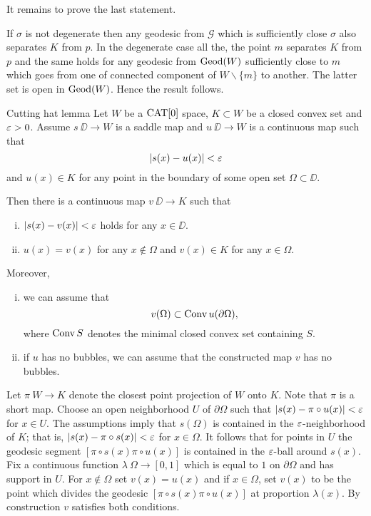 \documentclass{article}
\begin{document}
It remains to prove the last statement.

If $\sigma$ is not degenerate then any geodesic from $\mathcal{G}$ which is sufficiently close $\sigma$ also separates $K$ from $p$.
In the degenerate case all the, 
the point $m$ separates $K$ from $p$ 
and the same holds for any geodesic from $\mathop{\rm Geod}\nolimits(W)$ sufficiently close to $m$ which goes from one of connected component of $W\backslash\{m\}$ to another.
The latter  set is open in $\mathop{\rm Geod}\nolimits(W)$.
Hence the result follows.
\qeds




\begin{thm}{Cutting hat lemma}\label{lem:cutting-hat}
Let 
$W$ be a $\mathop{\rm CAT}\nolimits[0]$ space, 
$K\subset W$ be a closed convex set 
and $\varepsilon>0$.
Assume $s\:\DD\to W$ is a saddle map 
and $u\:\DD\to W$ is a continuous map such that 
\[|s(x)-u(x)|<\varepsilon\]
and $u(x)\in K$ for any point in the boundary of some open set $\Omega\subset \DD$.

Then there is a continuous map $v\:\DD\to K$ such that 
\begin{enumerate}[(i)]
\item $|s(x)-v(x)|<\varepsilon$ holds for any $x\in\DD$.
\item $u(x)=v(x)$ for any $x\notin\Omega$ and
$v(x)\in K$ for any $x\in\Omega$.
\end{enumerate}

Moreover,
\begin{enumerate}[(i)]
\addtocounter{enumi}{2}
\item we can assume that \[v(\Omega)\subset \mathop{\rm Conv}\nolimits u(\partial\Omega),\]
where $\mathop{\rm Conv}\nolimits S$ denotes the minimal closed convex set containing $S$.
\item\label{lem:cutting-hat:b} if $u$ has no bubbles, we can assume that the constructed map $v$ has no bubbles.
\end{enumerate}
\end{thm}

Let $\pi\:W\to K$ denote the closest point projection of $W$ onto $K$. Note that $\pi$
is a short map. Choose an open neighborhood $U$ of $\partial \Omega$ such that 
$|s(x)-\pi\circ u(x)|<\varepsilon$ for $x\in U$. The assumptions imply that $s(\Omega)$ is 
contained in the $\varepsilon$-neighborhood of $K$;
that is, $|s(x)-\pi\circ s(x)|<\varepsilon$ for $x\in\Omega$.
It follows that for points in $U$ the geodesic segment $[\pi\circ s(x)\pi\circ u(x)]$ is contained in the $\varepsilon$-ball
around $s(x)$. Fix a continuous function $\lambda\:\Omega\to [0,1]$
which is equal to $1$ on $\partial \Omega$ and has support in $U$.
For $x\notin \Omega$ set $v(x)=u(x)$ and if 
$x\in \Omega$, set $v(x)$ to be the point which divides the geodesic $[\pi\circ s(x)\pi\circ u(x)]$
at proportion $\lambda(x)$. By construction $v$ satisfies both conditions.
\end{document}
